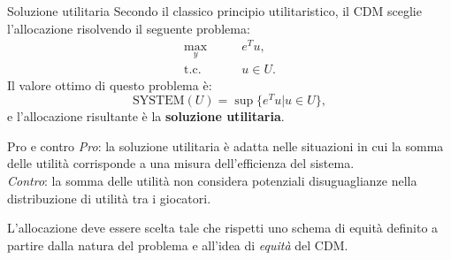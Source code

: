 \documentclass{beamer}
\begin{document}
\begin{frame}{Soluzione utilitaria}
	Secondo il classico principio utilitaristico, il CDM sceglie l'allocazione risolvendo il seguente problema:
	\begin{equation}
		\begin{split}
			\underset{y}{\text{max}} & \qquad e^T u, \\
			\text{t.c.} & \qquad u \in U.
		\end{split}
	\end{equation}
	Il valore ottimo di questo problema è:
	\begin{equation}
		\text{SYSTEM}(U) = \sup \{e^T u | u \in U\},
	\end{equation}
	e l'allocazione risultante è la \textbf{soluzione utilitaria}.
\end{frame}

\begin{frame}
	\begin{block}{Pro e contro}
		\textit{Pro}: la soluzione utilitaria è adatta nelle situazioni in cui la somma delle utilità corrisponde a una misura dell'efficienza del sistema.\\
		\textit{Contro}: la somma delle utilità non considera potenziali disuguaglianze nella distribuzione di utilità tra i giocatori.
	\end{block}
	L'allocazione deve essere scelta tale che rispetti uno schema di equità definito a partire dalla natura del problema e all'idea di \textit{equità} del CDM.
\end{frame}
\end{document}
